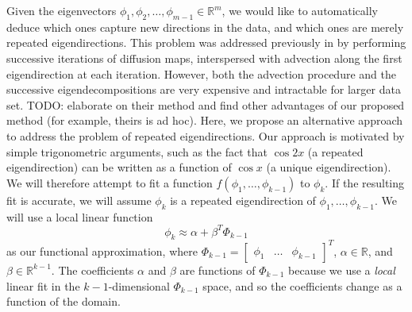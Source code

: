 \documentclass[preprint]{elsarticle}
\begin{document}
Given the eigenvectors $\phi_1, \phi_2, \dots, \phi_{m-1} \in \mathbb{R}^m$, we would like to automatically deduce which ones capture new directions in the data, and which ones are merely repeated eigendirections. 
%
This problem was addressed previously in \cite{...} by performing successive iterations of diffusion maps, interspersed with advection along the first eigendirection at each iteration. 
%
However, both the advection procedure and the successive eigendecompositions are very expensive and intractable for larger data set. 
TODO: elaborate on their method and find other advantages of our proposed method (for example, theirs is ad hoc). 
%
Here, we propose an alternative approach to address the problem of repeated eigendirections. 
%
Our approach is motivated by simple trigonometric arguments, such as the fact that $\cos2x$ (a repeated eigendirection) can be written as a function of $\cos x$ (a unique eigendirection). 
%
We will therefore attempt to fit a function $f(\phi_1, \dots, \phi_{k-1})$ to $\phi_{k}$. 
%
If the resulting fit is accurate, we will assume $\phi_{k}$ is a repeated eigendirection of $\phi_1, \dots, \phi_{k-1}$. 
%
We will use a local linear function 
\begin{equation}
\phi_k \approx \alpha + \beta^T \Phi_{k-1}
\end{equation}
%
as our functional approximation, where 
%
$\Phi_{k-1} = \begin{bmatrix} \phi_1 & \dots & \phi_{k-1} \end{bmatrix}^T$,
$\alpha \in \mathbb{R}$, and $\beta \in \mathbb{R}^{k-1}$. 
%
The coefficients $\alpha$ and $\beta$ are functions of $\Phi_{k-1}$ because we use a {\em local} linear fit in the $k-1$-dimensional $\Phi_{k-1}$ space, and so the coefficients change as a function of the domain. 
\end{document}
